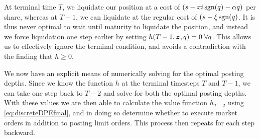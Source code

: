 At terminal time $T$, we liquidate our position at a cost of $(s - xi \operatorname{\mathrm{sgn}}(q) - \alpha q)$ per share, whereas at $T-1$, we can liquidate at the regular cost of $(s - \xi \operatorname{\mathrm{sgn}}(q)$. It is thus never optimal to wait until maturity to liquidate the position, and instead we force liquidation one step earlier by setting $h(T-1,\bm{z},q) = 0 \; \forall q$. This allows us to effectively ignore the terminal condition, and avoids a contradiction with the finding that $h \geq 0$.

We now have an explicit means of numerically solving for the optimal posting depths. Since we know the function $h$ at the terminal timesteps $T$ and $T-1$, we can take one step back to $T-2$ and solve for both the optimal posting depths. With these values we are then able to calculate the value function $h_{T-2}$ using \eqref{eq:discreteDPEfinal}, and in doing so determine whether to execute market orders in addition to posting limit orders. This process then repeats for each step backward.